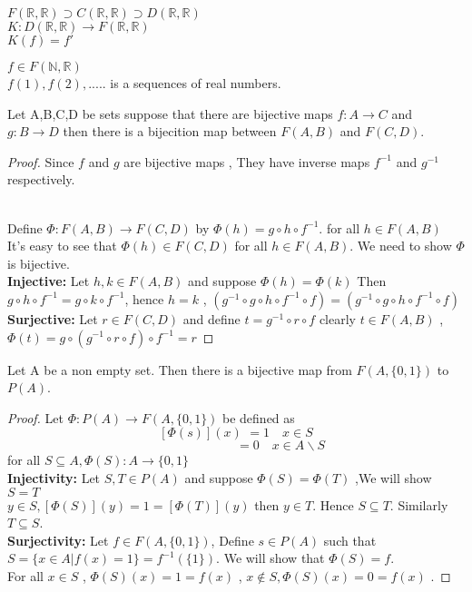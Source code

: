 \documentclass[a4paper,english,12pt]{article}   	%
\begin{document}
\begin{exmp} $F(\mathbb{R},\mathbb{R}) \supset C(\mathbb{R},\mathbb{R}) \supset D(\mathbb{R},\mathbb{R})$\\
$K \colon D(\mathbb{R},\mathbb{R}) \to F(\mathbb{R},\mathbb{R})$\\
$K(f)=f'$
\end{exmp}
\begin{exmp}
$f \in F(\mathbb{N},\mathbb{R})$ \\
$f(1),f(2),.....$ is a sequences of real numbers.
\end{exmp}
\begin{lem}
Let A,B,C,D be sets suppose that there are bijective maps $f \colon A \to C$ and $g \colon B \to D$ then there is a bijecition map between
$F(A,B)$ and $F(C,D)$.
\end{lem}
\begin{proof} Since $f$ and $g$ are bijective maps , They have inverse maps $f^{-1}$ and $g^{-1}$ respectively.
\begin{figure}[hhhh]
\centering
\scalebox{.8}{}
\caption{}
\label{}
\end{figure}\\
Define $\Phi \colon F(A,B) \to F(C,D)$ by $\Phi (h)=g \circ h \circ f^{-1}$. for all $h \in F(A,B)$ \\
It's easy to see that $\Phi (h) \in F(C,D)$ for all $h \in F(A,B)$. We need to show $\Phi$ is bijective.\\
\textbf{Injective:} Let $h,k \in F(A,B)$ and suppose $\Phi (h)=\Phi (k)$ Then $g \circ h \circ f^{-1} = g \circ k \circ f^{-1}$, hence $h=k$ , $(g^{-1} \circ g \circ h \circ f^{-1} \circ f)=(g^{-1} \circ g \circ h \circ f^{-1} \circ f)$\\
\textbf{Surjective:} Let $r \in F(C,D)$ and define $t=g^{-1} \circ r \circ f$ clearly $t \in F(A,B)$ , $\Phi (t)=g \circ (g^{-1} \circ r \circ f) \circ f^{-1}=r$
\end{proof}
\begin{prop} Let A be a non empty set. Then there is a bijective map from $F(A,\{0,1\})$ to $P(A)$.
\begin{proof} Let $\Phi \colon P(A) \to F(A,\{0,1\})$ be defined as\\
\[ [\Phi (s)](x)\, \, = 1  \quad  x \in S \] 
$\qquad \qquad \qquad \qquad \qquad \qquad \qquad \qquad \qquad=0 \quad  x \in A \backslash S$\\
for all $S \subseteq A , \Phi (S) \colon A \to \{0,1\}$\\
\textbf{Injectivity:} Let $S,T \in P(A)$ and suppose $\Phi (S)=\Phi (T)$ ,We will show $S=T$\\
$y \in S , [ \Phi (S)](y)=1=[ \Phi (T)](y)$ then $y \in T$. Hence $S \subseteq T$. Similarly $T \subseteq S$.\\
\textbf{Surjectivity:} Let $f \in F(A,\{0,1\})$, Define $s \in P(A)$ such that $S=\{x \in A | f(x)=1\}=f^{-1}(\{1\})$. We will show that 
$\Phi (S)=f$.\\ For all $x \in S$ , $\Phi (S)(x)=1=f(x)$ , $x \notin S , \Phi(S)(x)=0=f(x)$ .
\end{proof}
\end{prop}
\end{document}
